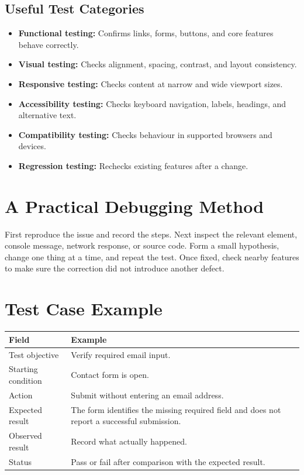 \documentclass[11pt,openany,oneside]{book}
\begin{document}
\subsection{Useful Test Categories}
\begin{itemize}
\item \textbf{Functional testing:} Confirms links, forms, buttons, and core features behave correctly.
\item \textbf{Visual testing:} Checks alignment, spacing, contrast, and layout consistency.
\item \textbf{Responsive testing:} Checks content at narrow and wide viewport sizes.
\item \textbf{Accessibility testing:} Checks keyboard navigation, labels, headings, and alternative text.
\item \textbf{Compatibility testing:} Checks behaviour in supported browsers and devices.
\item \textbf{Regression testing:} Rechecks existing features after a change.
\end{itemize}

\section{A Practical Debugging Method}
First reproduce the issue and record the steps. Next inspect the relevant element, console message, network response, or source code. Form a small hypothesis, change one thing at a time, and repeat the test. Once fixed, check nearby features to make sure the correction did not introduce another defect.

\section{Test Case Example}
\begin{tabularx}{\textwidth}{p{}X}
\toprule
Field & Example\\
\midrule
Test objective & Verify required email input.\\
Starting condition & Contact form is open.\\
Action & Submit without entering an email address.\\
Expected result & The form identifies the missing required field and does not report a successful submission.\\
Observed result & Record what actually happened.\\
Status & Pass or fail after comparison with the expected result.\\
\bottomrule
\end{tabularx}
\end{document}
